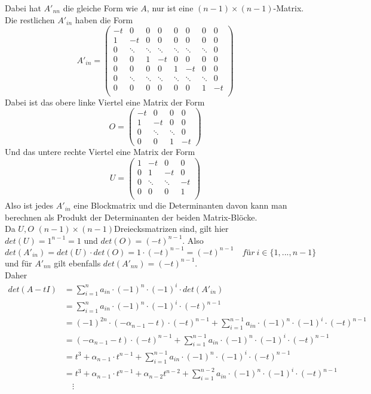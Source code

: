 \documentclass{article} %
\begin{document}
Dabei hat $A'_{nn}$ die gleiche Form wie $A$, nur ist eine $(n-1)\times(n-1)$-Matrix. Die restlichen $A'_{in}$ haben die Form 
\[
A'_{in} = \begin{pmatrix}
-t & 0 & 0 & 0 & 0 & 0 & 0 & 0 \\
1 & -t & 0 & 0 & 0 & 0 & 0 & 0  \\
0 &\ddots & \ddots & \ddots &\ddots &\ddots &\ddots &0  \\  
0 & 0 & 1 & -t & 0 & 0 & 0 & 0  \\
0 & 0 & 0 & 0 & 1 & -t & 0 & 0  \\
0 &\ddots & \ddots & \ddots &\ddots &\ddots &\ddots  &0\\
0 & 0 & 0 & 0 & 0 & 0 & 1 & -t \\
\end{pmatrix}
\]
Dabei ist das obere linke Viertel eine Matrix der Form 
\[
O=\begin{pmatrix}
-t & 0 & 0 &0 \\
1 & -t & 0 & 0 \\
0 &\ddots & \ddots & 0  \\  
0 & 0 & 1 & -t 
\end{pmatrix}
\]
Und das untere rechte Viertel eine Matrix der Form 
\[
U= \begin{pmatrix}
 1 & -t & 0 & 0  \\
 0 & 1 & -t & 0  \\
0&\ddots &\ddots  &-t\\
0 & 0 &0 & 1   \\
\end{pmatrix}
\]
Also ist jedes $A'_{in}$ eine Blockmatrix und die Determinanten davon kann man berechnen als Produkt der Determinanten der beiden Matrix-Blöcke. \\
Da $U, O$ $(n-1)\times(n-1)$Dreiecksmatrizen sind, gilt hier $det(U) = 1^{n-1} = 1$ und $det(O) = (-t)^{n-1}$.
Also
\[
det(A'_{in}) = det(U) \cdot det(O) = 1 \cdot (-t)^{n-1} = (-t)^{n-1} \quad für\ i \in \{1,...,n-1\}
\] 
und für $A'_{nn}$ gilt ebenfalls $det(A'_{nn}) = (-t)^{n-1}$. \\
Daher 
\begin{align*}
    det(A - t I) & =  \sum^n_{i = 1} a_{in} \cdot (-1)^{n} \cdot (-1)^{i} \cdot det(A'_{in})  \\
    & =  \sum^n_{i = 1} a_{in} \cdot (-1)^{n} \cdot (-1)^{i} \cdot (-t)^{n-1}  \\
    & = (-1)^{2n} \cdot (-\alpha_{n-1} -t)  \cdot (-t)^{n-1} +  \sum^{n-1}_{i = 1} a_{in} \cdot (-1)^{n} \cdot (-1)^{i} \cdot (-t)^{n-1}  \\
     & = (-\alpha_{n-1} -t)  \cdot (-t)^{n-1} +  \sum^{n-1}_{i = 1} a_{in} \cdot (-1)^{n} \cdot (-1)^{i} \cdot (-t)^{n-1}  \\
       & = t^3 + \alpha_{n-1}\cdot t^{n-1} +  \sum^{n-1}_{i = 1} a_{in} \cdot (-1)^{n} \cdot (-1)^{i} \cdot (-t)^{n-1}  \\
        & = t^3 + \alpha_{n-1}\cdot t^{n-1} + \alpha_{n-2}t^{n-2} + \sum^{n-2}_{i = 1} a_{in} \cdot (-1)^{n} \cdot (-1)^{i} \cdot (-t)^{n-1}  \\
       & \quad  \vdots
\end{align*}
\end{document}
